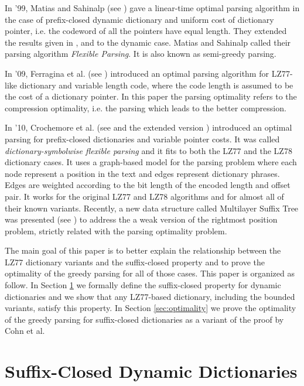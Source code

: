 \documentclass[12pt]{article}
\theoremstyle{plain}
\theoremstyle{definition}
\theoremstyle{remark}
\begin{document}
In '99, Matias and Sahinalp (see \cite{DBLP:conf/soda/MatiasS99}) gave a linear-time optimal parsing algorithm in the case of prefix-closed dynamic dictionary and uniform cost of dictionary pointer, i.e. the codeword of all the pointers have equal length. They extended the results given in \cite{rodeh1985}, \cite{DBLP:conf/dcc/Horspool95} and \cite{cancan} to the dynamic case. 
Matias and  Sahinalp called their parsing algorithm
\emph{Flexible Parsing}. It is also known as semi-greedy parsing.


In '09, Ferragina et al. (see \cite{FerraginaSODA09}) introduced an optimal parsing algorithm for LZ77-like dictionary and variable length code, where the code length is assumed to be the cost of a dictionary pointer. In this paper the parsing optimality refers to the compression optimality, i.e. the parsing which leads to the better compression.

In '10, Crochemore et al. (see \cite{cglmr_iwoca10} and the extended version \cite{cglmr_JDA2011}) introduced an optimal parsing for prefix-closed dictionaries and variable pointer costs. It was called  \textit{dictionary-symbolwise flexible parsing} and it fits to both the LZ77 and the LZ78 dictionary cases.
It uses a graph-based model for the parsing problem where each node represent a position in the text and edges represent dictionary phrases. Edges are weighted according to the bit length of the encoded length and offset pair. It works for the original LZ77 and LZ78 algorithms and for almost all of their known variants. Recently, a new data structure called Multilayer Suffix Tree was presented (see \cite{dccpaper2013}) to address the a weak version of the rightmost position problem, strictly related with the parsing optimality problem.

\medskip

The main goal of this paper is to better explain the relationship between the LZ77 dictionary variants and the suffix-closed property and to prove the optimality of the greedy parsing for all of those cases. 
This paper is organized as follow. In Section \ref{sec:suffixclosed} we formally define the suffix-closed property for dynamic dictionaries and we  show that any LZ77-based dictionary, including the bounded variants, satisfy this property. 
In Section \ref{sec:optimality} we prove the optimality of the greedy parsing for suffix-closed dictionaries as a variant of the proof by Cohn et al.


\section{Suffix-Closed Dynamic Dictionaries}\label{sec:suffixclosed}
\end{document}
